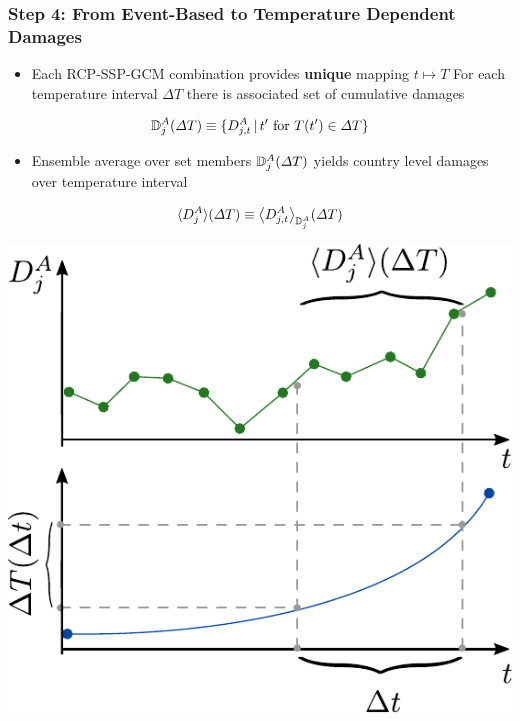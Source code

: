 \documentclass[
c,
11pt,
aspectratio=169, %
final,
]{beamer}
\begin{document}
\begin{frame}
  \frametitle{Step 4: From Event-Based to Temperature Dependent Damages}
  \begin{minipage}[t]{.65\linewidth}
    \vspace{0pt}
  \begin{itemize}
  \item Each RCP-SSP-GCM combination provides \textbf{unique} mapping $t \mapsto T$
    \arrowitem For each temperature interval $\Delta T$ there is associated set of cumulative damages
  \end{itemize}
    \begin{equation*}
   \mathbb{D}^A_{j}(\Delta T)\equiv\lbrace D^A_{j,t}\, \vert\, t' \text{ for } T(t')\in\Delta T \rbrace
 \end{equation*}
 \vspace{-20pt}
\begin{itemize}
\item Ensemble average over set members $\mathbb{D}^A_{j}(\Delta T)$ yields country level damages over temperature interval  
\end{itemize}
\begin{equation*}
  \langle D^A_{j}\rangle(\Delta T)\equiv\big\langle D^A_{j,t}\big\rangle_{\mathbb{D}^A_{j}}(\Delta T)
\end{equation*}
\end{minipage}\hfill
\begin{minipage}[t]{.35\linewidth}
  \vspace{20pt}
  \centering
  \includegraphics[width=\linewidth]{figures/damage_averaging}
\end{minipage}
\end{frame}
\end{document}

